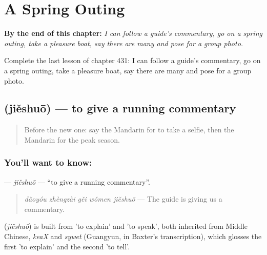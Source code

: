 
\chapter{A Spring Outing}
\label{ch:zh-a-spring-outing}

\begin{chapteropening}
\textbf{By the end of this chapter:} \emph{I can follow a guide's commentary, go on a spring outing, take a pleasure boat, say there are many and pose for a group photo.}

Complete the last lesson of chapter 431: I can follow a guide's commentary, go on a spring outing, take a pleasure boat, say there are many and pose for a group photo.
\end{chapteropening}

\section[\texorpdfstring{\zh{解说} (jiěshuō)}{解说 (jiěshuō)}]{ (jiěshuō) — to give a running commentary}

\label{lesson:ZH-C431-jieshuo}



\begin{quote}
Before the new one: say the Mandarin for to take a selfie, then the Mandarin for the peak season.
\end{quote}

\subsection*{You'll want to know: }
\textbf{} — \emph{jiěshuō} — \textquotedblleft{}to give a running commentary\textquotedblright{}.

\begin{quote}
\emph{dǎoyóu zhèngzài gěi wǒmen jiěshuō} — The guide is giving us a commentary.
\end{quote}

\begin{cousinweb}
\textbf{} (\emph{jiěshuō}) is built from  'to explain' and  'to speak', both inherited from Middle Chinese, \emph{keaX} and \emph{sywet} (Guangyun, in Baxter's transcription), which glosses the first 'to explain' and the second 'to tell'.
\end{cousinweb}

